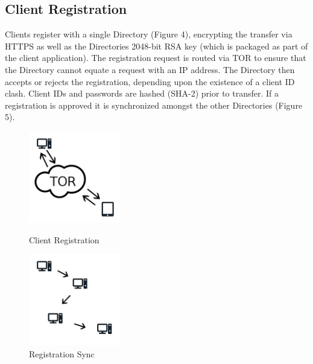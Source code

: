 \documentclass{article}
\begin{document}
\subsection{Client Registration}
Clients register with a single Directory (Figure 4), encrypting the transfer via HTTPS as well as the Directories 2048-bit RSA key (which is packaged as part of the client application).
The registration request is routed via TOR to ensure that the Directory cannot equate a request with an IP address. The Directory then accepts or rejects the registration, 
depending upon the existence of a client ID clash. Client IDs and passwords are hashed (SHA-2) prior to transfer. If a registration is approved it is synchronized amongst the other 
Directories (Figure 5).
\begin{figure}[h]
\centering
\begin{minipage}{.4\textwidth}
  	\centering
  	\includegraphics[width=4cm,height=4cm,keepaspectratio]{img/ClientRegistration.png}
	\caption{Client Registration}
\end{minipage}
\begin{minipage}{.4\textwidth}
  	\centering
	\includegraphics[width=4cm,height=4cm,keepaspectratio]{img/RegistrationSync.png}
	\caption{Registration Sync}
\end{minipage}
\end{figure}
\end{document}
